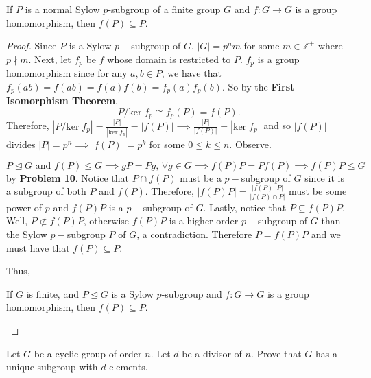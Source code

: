 \documentclass[addpoints,10pt]{exam}
\theoremstyle{plain}
\theoremstyle{definition}
\newtheorem{prob}[thm]{Problem}
\theoremstyle{plain}
\theoremstyle{plain}
\theoremstyle{definition}
\let\oldprob\prob
\let\endoldprob\endprob
\renewenvironment{prob}
  {\begin{singlespace}\oldprob}
  {\endoldprob\end{singlespace}}
\newcommand{\belowtitle}{\leavevmode\newline}
\newcommand{\ZZ}{\ensuremath{\mathbb{Z}}}
\begin{document}
\newpage
\setcounter{thm}{36}
\begin{prob}\belowtitle If $P$ is a normal Sylow $p$-subgroup of a finite group $G$ and $f:G\to G$ is a group homomorphism, then $f(P)\subseteq P$.\end{prob}

  \begin{proof}Since $P$ is a Sylow $p-$subgroup of $G$, $|G|=p^{n}m$ for some $m\in \ZZ^{+}$ where $p\nmid m$.\belowtitle
  Next, let $f_{p}$ be $f$ whose domain is restricted to $P$. $f_{p}$ is a group homomorphism since for any $a,b\in P$, we have that $f_{p}(ab)=f(ab)=f(a)f(b)=f_{p}(a)f_{p}(b)$. So by the \textbf{First Isomorphism Theorem},
    $$P/\mathrm{ker}\;f_{p}\cong f_{p}(P)=f(P).$$
  Therefore, $|P/\mathrm{ker}\;f_{p}|=\frac{|P|}{|\mathrm{ker}\;f_{p}|}=|f(P)|\implies \frac{|P|}{|f(P)|}=|\mathrm{ker}\;f_{p}|$ and so $|f(P)|$ divides $|P|=p^{n}\implies |f(P)|=p^{k}$ for some $0\leq k\leq n.$ Observe.

  $P\trianglelefteq G\text{ and }f(P)\leq G \implies gP=Pg,\,\forall g\in G\implies f(P)P=Pf(P)\implies f(P)P\leq G$ by \textbf{Problem 10}. Notice that $P\cap f(P)$ must be a $p-$subgroup of $G$ since it is a subgroup of both $P$ and $f(P)$. Therefore, $|f(P)P|=\frac{|f(P)||P|}{|f(P)\cap P|}$ must be some power of $p$ and $f(P)P$ is a $p-$subgroup of $G$. Lastly, notice that $P\subseteq f(P)P$. Well, $P\not\subset f(P)P$, otherwise $f(P)P$ is a higher order $p-$subgroup of $G$ than the Sylow $p-$subgroup $P$ of $G$, a contradiction. Therefore $P=f(P)P$ and we must have that $f(P)\subseteq P$.



  Thus,
  \begin{center}
  If $G$ is finite, and $P\trianglelefteq G$ is a Sylow $p$-subgroup and $f:G\to G$ is a group homomorphism, then $f(P)\subseteq P$.
  \end{center}
\end{proof}
\newpage
\begin{prob}\belowtitle Let $G$ be a cyclic group of order $n$. Let $d$ be a divisor of $n$. Prove that $G$ has a unique subgroup with $d$ elements.\end{prob}
\end{document}
